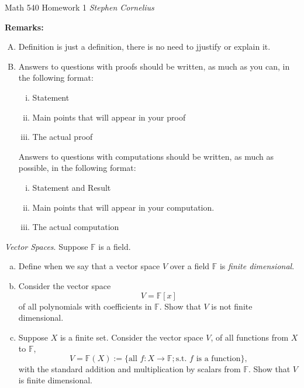 \documentclass{article}
\begin{document}
\begin{center}
    Math 540
    \hfill Homework 1
    \hfill \textit{Stephen Cornelius}
\end{center}
\textbf{Remarks:} \\
\begin{enumerate}[A)]
    \item Definition is just a definition, there is no need to jjustify or explain it.
    \item Answers to questions with proofs should be written, as much as you can, in the following format: \\
    \begin{enumerate}[i)]
        \item Statement
        \item Main points that will appear in your proof
        \item The actual proof
    \end{enumerate}
    Answers to questions with computations should be written, as much as possible, in the following format:
    \begin{enumerate}[i)]
        \item Statement and Result
        \item Main points that will appear in your computation.
        \item The actual computation
    \end{enumerate}
\end{enumerate}







\begin{problem}
    \textit{Vector Spaces}. Suppose $\mathbb{F}$ is a field.
    \begin{enumerate}[a)]
        \item Define when we say that a vector space $V$ over a field $\mathbb{F}$ is \textit{finite dimensional}.
        \item Consider the vector space
        \[
            V = \mathbb{F}[x]
        \]
        of all polynomials with coefficients in $\mathbb{F}$. Show that $V$ is not finite dimensional.
        \item Suppose $X$ is a finite set. Consider the vector space $V$, of all functions from $X$ to $\mathbb{F}$,
        \[
            V = \mathbb{F}(X):= \{\text{all }f: X \to \mathbb{F}; \text{s.t. $f$ is a function}\},
        \]
        with the standard addition and multiplication by scalars from $\mathbb{F}$. Show that $V$ is finite dimensional.
    \end{enumerate}
\end{problem}
\end{document}

